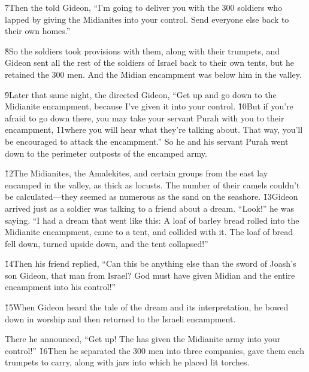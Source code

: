 \v{7}Then the  told Gideon, ``I'm going to deliver you with the 300 soldiers who lapped by giving the Midianites into your control. Send everyone else back to their own homes.''

\v{8}So the soldiers took provisions with them, along with their trumpets, and Gideon sent all the rest of the soldiers of Israel back to their own tents, but he retained the 300 men. And the Midian encampment was below him in the valley.

\v{9}Later that same night, the  directed Gideon, ``Get up and go down to the Midianite encampment, because I've given it into your control. \v{10}But if you're afraid to go down there, you may take your servant Purah with you to their encampment, \v{11}where you will hear what they're talking about. That way, you'll be encouraged to attack the encampment.'' So he and his servant Purah went down to the perimeter outposts of the encamped army.

\v{12}The Midianites, the Amalekites, and certain groups from the east lay encamped in the valley, as thick as locusts. The number of their camels couldn't be calculated---they seemed as numerous as the sand on the seashore. \v{13}Gideon arrived just as a soldier was talking to a friend about a dream. ``Look!'' he was saying. ``I had a dream that went like this: A loaf of barley bread rolled into the Midianite encampment, came to a tent, and collided with it. The loaf of bread fell down, turned upside down, and the tent collapsed!''

\v{14}Then his friend replied, ``Can this be anything else than the sword of Joash's son Gideon, that man from Israel? God must have given Midian and the entire encampment into his control!''

\v{15}When Gideon heard the tale of the dream and its interpretation, he bowed down in worship and then returned to the Israeli encampment.

There he announced, ``Get up! The  has given the Midianite army into your control!'' \v{16}Then he separated the 300 men into three companies, gave them each trumpets to carry, along with jars into which he placed lit torches.

